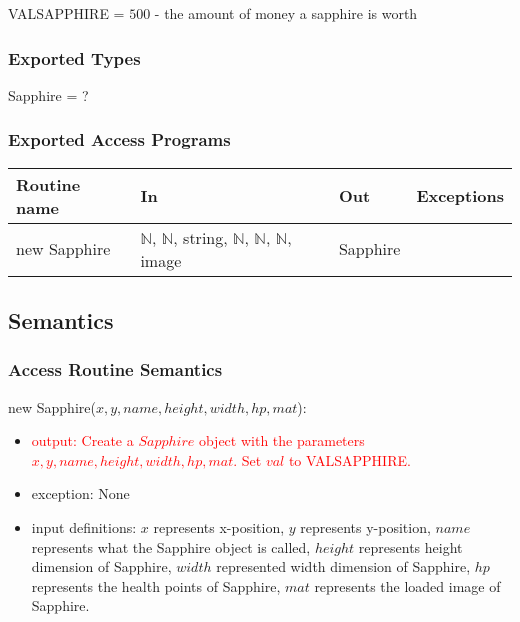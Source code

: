 \documentclass[12pt]{article}
\newcommand{\m}[1]{\mbox{#1}}
\begin{document}
VALSAPPHIRE = $500$ - the amount of money a sapphire is worth

\subsubsection*{Exported Types}

Sapphire = ?

\subsubsection*{Exported Access Programs}

\begin{tabular}{| l | l | l | l |}
\hline
\textbf{Routine name} & \textbf{In} & \textbf{Out} & \textbf{Exceptions}\\
\hline
new Sapphire & $\mathbb{N}$, $\mathbb{N}$, string, $\mathbb{N}$, $\mathbb{N}$, $\mathbb{N}$, image & Sapphire & ~\\
\hline
\end{tabular}

\subsection*{Semantics}

\subsubsection*{Access Routine Semantics}

new Sapphire($x, y, name, height, width, hp, mat$):
\begin{itemize}
    \item \textcolor{red}{output: Create a $Sapphire$ object with the parameters $x, y, name, height, width, hp, mat$. Set $val$ to VALSAPPHIRE.}
    \item exception: None
    \item input definitions: $x$ represents x-position, $y$ represents y-position, $name$ represents what the Sapphire object is called, $height$ represents height dimension of Sapphire, $width$ represented width dimension of Sapphire, $hp$ represents the health points of Sapphire, $mat$ represents the loaded image of Sapphire.
\end{itemize}
\end{document}
